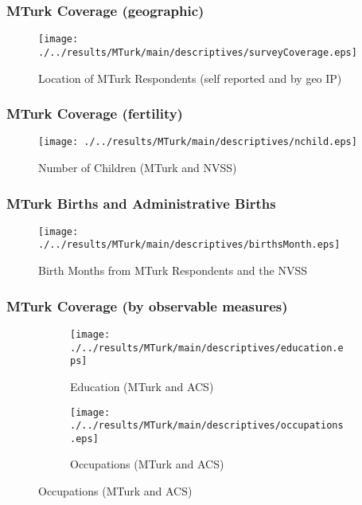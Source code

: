 \documentclass[10pt,letterpaper,subeqn]{beamer}
\begin{document}
\begin{frame}[label=MTurkCover]
  \frametitle{MTurk Coverage (geographic)}
  \begin{figure}[htpb!]
    \begin{center}
      \centering
      \caption{Location of MTurk Respondents (self reported and by geo IP)}
      \texttt{[image: ./../results/MTurk/main/descriptives/surveyCoverage.eps]}
    \end{center}
  \end{figure}
  \vspace{-5mm}
\end{frame}

\begin{frame}[label=MTurkCover3]
  \frametitle{MTurk Coverage (fertility)}
  \begin{figure}[htpb!]
    \begin{center}
      \centering
      \caption{Number of Children (MTurk and NVSS)}
      \texttt{[image: ./../results/MTurk/main/descriptives/nchild.eps]}
    \end{center}
  \end{figure}
  \vspace{-5mm}
\end{frame}

\begin{frame}
  \frametitle{MTurk Births and Administrative Births}
  \begin{figure}[htpb!]
  \begin{center}
    \caption{Birth Months from MTurk Respondents and the NVSS}
    \label{fig:compBmonth}
    \texttt{[image: ./../results/MTurk/main/descriptives/birthsMonth.eps]}
  \end{center}
\end{figure}
\end{frame}

\begin{frame}[label=MTurkCover2]
  \frametitle{MTurk Coverage (by observable measures)}
  \begin{figure}[htpb!]
    \begin{center}
      \label{fig:tempUSA}
      \begin{subfigure}{.5\textwidth}
        \centering
        \texttt{[image: ./../results/MTurk/main/descriptives/education.eps]}
        \caption{Education (MTurk and ACS)}
        \label{fig:tempUSAYoung}
      \end{subfigure}%
      \begin{subfigure}{.5\textwidth}
        \centering
        \texttt{[image: ./../results/MTurk/main/descriptives/occupations.eps]}
        \caption{Occupations (MTurk and ACS)}
        \label{fig:tempUSAOld}
      \end{subfigure}
    \end{center}
  \end{figure}
  \vspace{8mm}
\end{frame}
\end{document}
